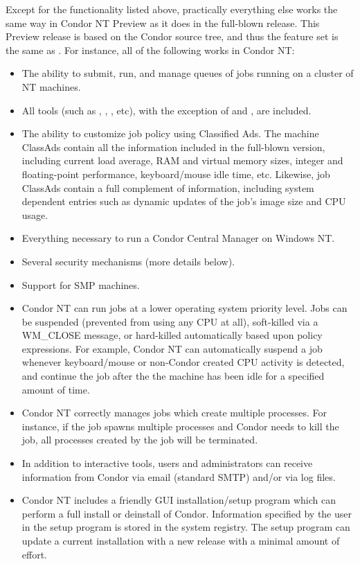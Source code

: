 Except for the functionality listed above, practically everything else works
the same way in Condor NT Preview as it does in the full-blown release.
This Preview release is based on the Condor \VersionNotice source tree, and thus the
feature set is the same as \VersionNotice.  For instance, all of the following works in Condor NT:
\begin{itemize}

\item The ability to submit, run, and manage queues of jobs running on a
cluster of NT machines.

\item All tools (such as , , ,
etc), with the exception of  and , are included.

\item The ability to customize job policy using Classified Ads.  The machine
ClassAds contain all the information included in the full-blown version,
including current load average, RAM and virtual memory sizes, integer and
floating-point performance, keyboard/mouse idle time, etc.  Likewise, job
ClassAds contain a full complement of information, including system
dependent entries such as dynamic updates of the job's image size and CPU
usage.

\item Everything necessary to run a Condor Central Manager on Windows NT.

\item Several security mechanisms (more details below).

\item Support for SMP machines.

\item Condor NT can run jobs at a lower operating system priority level.
Jobs can be suspended (prevented from using any CPU at all), soft-killed via
a WM\_CLOSE message, or hard-killed automatically based upon policy
expressions.  For example, Condor NT can automatically suspend a job
whenever keyboard/mouse or non-Condor created CPU activity is detected, and
continue the job after the the machine has been idle for a specified amount
of time.

\item Condor NT correctly manages jobs which create multiple processes.  For
instance, if the job spawns multiple processes and Condor needs to kill the
job, all processes created by the job will be terminated.

\item In addition to interactive tools, users and administrators can receive
information from Condor via email (standard SMTP) and/or via log files.

\item Condor NT includes a friendly GUI installation/setup program which can
perform a full install or deinstall of Condor.
Information specified by the user in the setup program is stored in the
system registry.  The setup program can update a current installation with a
new release with a minimal amount of effort.

\end{itemize}


